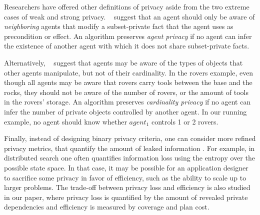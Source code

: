 \documentclass{article}
\newcommand{\commentout}[1]{}
\newcommand{\rotem}[1]{\textbf{\color{red}[ROTEM:#1]}}
\theoremstyle{remark}
\newcommand{\citet}[1]{\citeauthor{#1}~\shortcite{#1}}
\newcommand{\citep}[1]{\cite{#1}}
\begin{document}
Researchers have offered other definitions of privacy aside from the two extreme cases of weak and strong privacy. \citet{FwdBwd} suggest that an agent should only be aware of {\em neighboring} agents that modify a subset-private fact that the agent uses as precondition or effect. 
An algorithm preserves {\em agent privacy} if no agent can infer the existence of another agent with which it does not share subset-private facts. \commentout{\rotem{I commented out the logistic example because in the rovers example there are only 2 agents...}}\commentout{For example, in our running example, agent 6 should be unaware of the existence of agents $1,2,3$.}

Alternatively, \citet{DPP} suggest that agents may be aware of the types of objects that other agents manipulate, but not of their cardinality. In the rovers example, even though all agents may be aware that rovers carry tools between the base and the rocks, they should not be aware of the number of rovers, or the amount of tools in the rovers' storage.\commentout{\rotem{rovers example above, even though all agents may be aware that rovers carry tools between the base and the rocks, they should not be aware of the number of rovers, or the amount of tools in the rovers' storage.}}\commentout{logistics example above, even though all agents may be aware that trucks carry packages between cities, they should not be aware of the number of trucks, or the number of cities that trucks travel between.} An algorithm preserves {\em cardinality privacy} if no agent can infer the number of private objects controlled by another agent. In our running example, no agent should know whether $agent_1$ controls 1 or 2 rovers.\commentout{\rotem{no agent should know whether $agent_1$ controls 1 or 2 rovers.}}\commentout{no agent should know whether $5$ covers 2 or 3 cities.}

Finally, instead of designing binary privacy criteria, one can consider more refined privacy metrics, that quantify the amount of leaked information \citep{vstolba2018quantifying}. For example, in distributed search \citep{maheswaran2006privacy} one often quantifies information loss using the entropy over the possible state space.
In that case, it may be possible for an application designer to sacrifice some privacy in favor of efficiency, such as the ability to scale up to larger problems.
The trade-off between privacy loss and efficiency is also studied in our paper, where privacy loss is quantified by the amount of revealed private dependencies and efficiency is measured by coverage and plan cost.
\commentout{\rotem{The trade-off between privacy loss and efficiency is also studied in our paper, where privacy loss is quantified by the amount of revealed private dependencies and efficiency is measured by coverage and plan cost.}}
\end{document}
